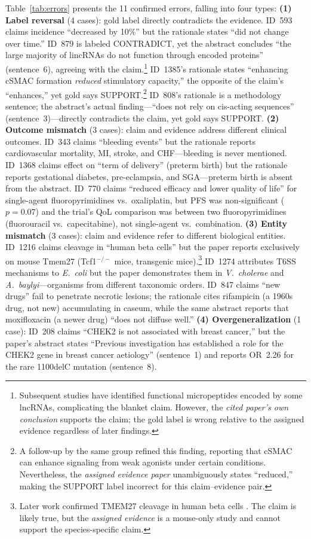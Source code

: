 \documentclass[11pt]{article}
\begin{document}
Table~\ref{tab:errors} presents the 11 confirmed errors, falling into four types:
\textbf{(1) Label reversal} (4 cases): gold label directly contradicts the evidence.
ID~593 claims incidence ``decreased by 10\%'' but the rationale states ``did not change over time.''
ID~879 is labeled CONTRADICT, yet the abstract concludes ``the large majority of lincRNAs do not function through encoded proteins'' (sentence~6), agreeing with the claim.\footnote{Subsequent studies have identified functional micropeptides encoded by some lncRNAs, complicating the blanket claim. However, the \emph{cited paper's own conclusion} supports the claim; the gold label is wrong relative to the assigned evidence regardless of later findings.}
ID~1385's rationale states ``enhancing cSMAC formation \emph{reduced} stimulatory capacity,'' the opposite of the claim's ``enhances,'' yet gold says SUPPORT.\footnote{A follow-up by the same group \citep{cemerski2008immunological} refined this finding, reporting that cSMAC can enhance signaling from weak agonists under certain conditions. Nevertheless, the \emph{assigned evidence paper} unambiguously states ``reduced,'' making the SUPPORT label incorrect for this claim--evidence pair.}
ID~808's rationale is a methodology sentence; the abstract's actual finding---``does not rely on cis-acting sequences'' (sentence~3)---directly contradicts the claim, yet gold says SUPPORT.
\textbf{(2) Outcome mismatch} (3 cases): claim and evidence address different clinical outcomes.
ID~343 claims ``bleeding events'' but the rationale reports cardiovascular mortality, MI, stroke, and CHF---bleeding is never mentioned.
ID~1368 claims effect on ``term of delivery'' (preterm birth) but the rationale reports gestational diabetes, pre-eclampsia, and SGA---preterm birth is absent from the abstract.
ID~770 claims ``reduced efficacy and lower quality of life'' for single-agent fluoropyrimidines vs.\ oxaliplatin, but PFS was non-significant ($p{=}0.07$) and the trial's QoL comparison was between two fluoropyrimidines (fluorouracil vs.\ capecitabine), not single-agent vs.\ combination.
\textbf{(3) Entity mismatch} (3 cases): claim and evidence refer to different biological entities.
ID~1216 claims cleavage in ``human beta cells'' but the paper reports exclusively on mouse Tmem27 (Tcf1$^{-/-}$ mice, transgenic mice).\footnote{Later work confirmed TMEM27 cleavage in human beta cells \citep{esterhazy2011bace2}. The claim is likely true, but the \emph{assigned evidence} is a mouse-only study and cannot support the species-specific claim.}
ID~1274 attributes T6SS mechanisms to \textit{E.\ coli} but the paper demonstrates them in \textit{V.\ cholerae} and \textit{A.\ baylyi}---organisms from different taxonomic orders.
ID~847 claims ``new drugs'' fail to penetrate necrotic lesions; the rationale cites rifampicin (a 1960s drug, not new) accumulating in caseum, while the same abstract reports that moxifloxacin (a newer drug) ``does not diffuse well.''
\textbf{(4) Overgeneralization} (1 case): ID~208 claims ``CHEK2 is not associated with breast cancer,'' but the paper's abstract states ``Previous investigation has established a role for the CHEK2 gene in breast cancer aetiology'' (sentence~1) and reports OR~2.26 for the rare 1100delC mutation (sentence~8).
\end{document}
